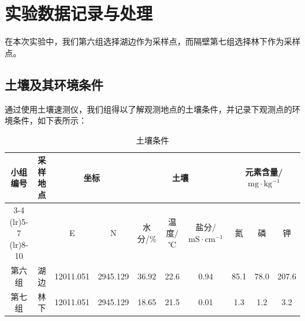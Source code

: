 \documentclass[10.5pt]{config}
\begin{document}
\section{实验数据记录与处理}

在本次实验中，我们第六组选择湖边作为采样点，而隔壁第七组选择林下作为采样点。

\subsection{土壤及其环境条件}

通过使用土壤速测仪，我们组得以了解观测地点的土壤条件，并记录下观测点的环境条件，如下表所示：

\begin{table}[h]
    \centering
    \caption{土壤条件}
    \label{tab:soil-conditions-compact} 
    
    \begin{tabular}{cccccccccc} 
        \toprule
        
        
        \multirow{2}{*}{小组编号} & 
        
        \multirow{2}{*}{采样地点} &
        
        \multicolumn{2}{c}{坐标} & 
        
        \multicolumn{3}{c}{土壤} &
        
        \multicolumn{3}{c}{元素含量/$\text{mg}\cdot\text{kg}^{-1}$} \\
        
        
        \cmidrule(lr){3-4} \cmidrule(lr){5-7} \cmidrule(lr){8-10}
        
        
        & & E & N & 水分/\% & 温度/℃ & 盐分/$\text{mS}\cdot\text{cm}^{-1}$ & 氮 & 磷 & 钾 \\
        
        \midrule
        
        第六组 & 湖边 & 12011.051 & 2945.129 & 36.92 & 22.6 & 0.94 & 85.1 & 78.0 & 207.6 \\
        
        第七组 & 林下 & 12011.051 & 2945.129 & 18.65 & 21.5 & 0.01 & 1.3 & 1.2 & 3.2 \\
        
        \bottomrule
    \end{tabular}
\end{table}
\end{document}
